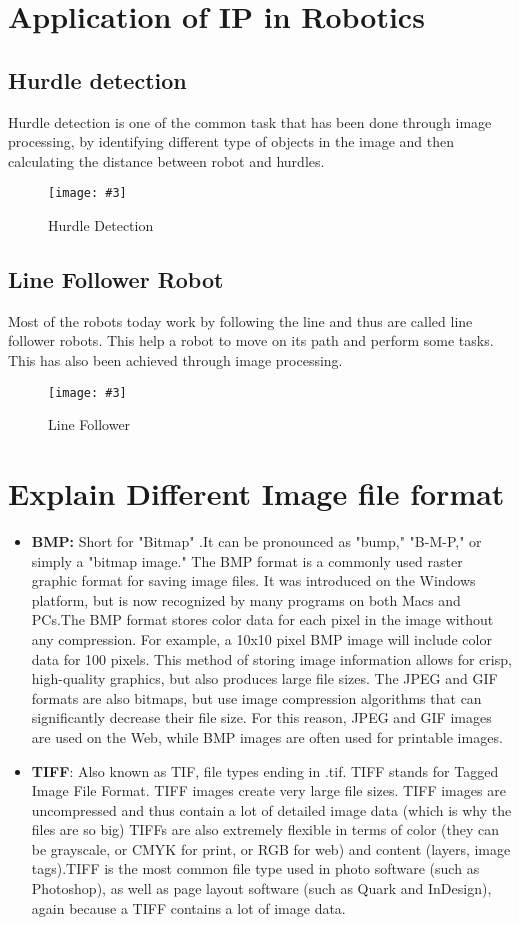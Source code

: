 \documentclass{article}
\newcommand{\addImage}[5]{
    \begin{figure}[#1]
        \centering
        \texttt{[image: \#3]}
        \caption{#4}
        \label{fig:#5}
    \end{figure}
}
\begin{document}
\begin{multicols}{2}
        \section{Application of IP in Robotics}
            \subsection{Hurdle detection}
                Hurdle detection is one of the common task that has been done through image processing, by identifying different type of objects in the image and then calculating the distance between robot and hurdles.
                \addImage{H}{8cm}{hurdle.jpg}{Hurdle Detection}{Hurdle Detection}
            \subsection{Line Follower Robot}
                Most of the robots today work by following the line and thus are called line follower robots. This help a robot to move on its path and perform some tasks. This has also been achieved through image processing.
                \addImage{H}{8cm}{lineFollower.jpg}{Line Follower}{line Follower}
        
        
        \section{Explain Different Image file format}
            \begin{itemize} 
                \item \textbf{BMP:} Short for "Bitmap" .It can be pronounced as "bump," "B-M-P," or simply a "bitmap image." The BMP format is a commonly used raster graphic format for saving image files. It was introduced on the Windows platform, but is now recognized by many programs on both Macs and PCs.The BMP format stores color data for each pixel in the image without any compression. For example, a 10x10 pixel BMP image will include color data for 100 pixels. This method of storing image information allows for crisp, high-quality graphics, but also produces large file sizes. The JPEG and GIF formats are also bitmaps, but use image compression algorithms that can significantly decrease their file size. For this reason, JPEG and GIF images are used on the Web, while BMP images are often used for printable images.

                \item \textbf{TIFF}: Also known as TIF, file types ending in .tif. TIFF stands for Tagged Image File Format. TIFF images create very large file sizes. TIFF images are uncompressed and thus contain a lot of detailed image data (which is why the files are so big) TIFFs are also extremely flexible in terms of color (they can be grayscale, or CMYK for print, or RGB for web) and content (layers, image tags).TIFF is the most common file type used in photo software (such as Photoshop), as well as page layout software (such as Quark and InDesign), again because a TIFF contains a lot of image data.


\end{itemize}
\end{multicols}
\end{document}
